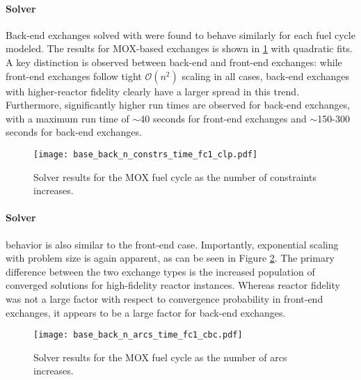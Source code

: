 \paragraph{\clp Solver}

Back-end exchanges solved with \clp were found to behave similarly for each fuel
cycle modeled. The results for MOX-based exchanges is shown in
\ref{fig:base_back_n_constrs_time_fc1_clp} with quadratic fits. A key distinction
is observed between back-end and front-end exchanges: while front-end exchanges
follow tight $\mathcal{O}(n^2)$ scaling in all cases, back-end exchanges with
higher-reactor fidelity clearly have a larger spread in this trend. Furthermore,
significantly higher run times are observed for back-end exchanges, with a
maximum run time of $\sim$40 seconds for front-end exchanges and $\sim$150-300
seconds for back-end exchanges.

\begin{figure}[h!]
  \begin{center}
    \texttt{[image: base\_back\_n\_constrs\_time\_fc1\_clp.pdf]}
    \caption{
      \label{fig:base_back_n_constrs_time_fc1_clp}
      \clp Solver results for the MOX fuel cycle as the number of constraints
      increases.      
    }
  \end{center}
\end{figure}

\paragraph{\cbc Solver}

\cbc behavior is also similar to the front-end case. Importantly, exponential
scaling with problem size is again apparent, as can be seen in Figure
\ref{fig:base_back_n_arcs_time_fc1_cbc}. The primary difference between the two
exchange types is the increased population of converged solutions for
high-fidelity reactor instances. Whereas reactor fidelity was not a large factor
with respect to convergence probability in front-end exchanges, it appears to be
a large factor for back-end exchanges.
 
\begin{figure}[h!]
  \begin{center}
    \texttt{[image: base\_back\_n\_arcs\_time\_fc1\_cbc.pdf]}
    \caption{
      \label{fig:base_back_n_arcs_time_fc1_cbc}
      \cbc Solver results for the MOX fuel cycle as the number of arcs
      increases.      
    }
  \end{center}
\end{figure}

